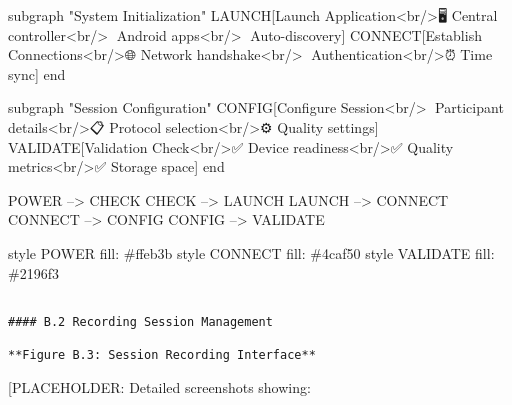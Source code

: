 \documentclass[12pt,a4paper]{report}
\begin{document}
subgraph "System Initialization"
LAUNCH[Launch Application<br/>🖥️ Central controller<br/>📱 Android apps<br/>🔗 Auto-discovery]
CONNECT[Establish Connections<br/>🌐 Network handshake<br/>🔐 Authentication<br/>⏰ Time sync]
end

subgraph "Session Configuration"
CONFIG[Configure Session<br/>👤 Participant details<br/>📋 Protocol selection<br/>⚙️ Quality settings]
VALIDATE[Validation Check<br/>✅ Device readiness<br/>✅ Quality metrics<br/>✅ Storage space]
end

POWER --> CHECK
CHECK --> LAUNCH
LAUNCH --> CONNECT
CONNECT --> CONFIG
CONFIG --> VALIDATE

style POWER fill: \#ffeb3b
style CONNECT fill: \#4caf50
style VALIDATE fill: \#2196f3
\begin{verbatim}

#### B.2 Recording Session Management

**Figure B.3: Session Recording Interface**

\end{verbatim}
[PLACEHOLDER: Detailed screenshots showing:
\end{document}
